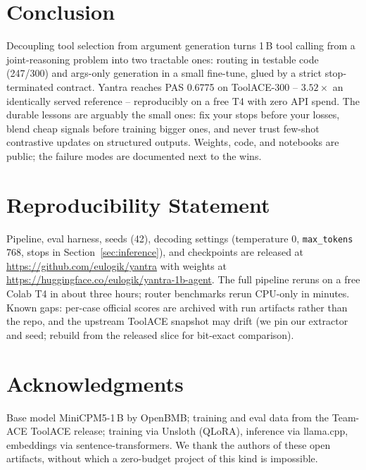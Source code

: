 \documentclass[11pt]{article}
\newcommand{\code}[1]{\texttt{#1}}
\begin{document}
\section{Conclusion}
\label{sec:conclusion}

Decoupling tool selection from argument generation turns 1\,B tool calling from a
joint-reasoning problem into two tractable ones: routing in testable code
(247/300) and args-only generation in a small fine-tune, glued by a strict
stop-terminated contract. Yantra reaches PAS 0.6775 on ToolACE-300 --
$3.52\times$ an identically served reference -- reproducibly on a free T4 with
zero API spend. The durable lessons are arguably the small ones: fix your stops
before your losses, blend cheap signals before training bigger ones, and never
trust few-shot contrastive updates on structured outputs. Weights, code, and
notebooks are public; the failure modes are documented next to the wins.

\section*{Reproducibility Statement}
Pipeline, eval harness, seeds (42), decoding settings (temperature 0,
\code{max\_tokens} 768, stops in Section~\ref{sec:inference}), and checkpoints
are released at \url{https://github.com/eulogik/yantra} with weights at
\url{https://huggingface.co/eulogik/yantra-1b-agent}. The full pipeline reruns on a free
Colab T4 in about three hours; router benchmarks rerun CPU-only in minutes.
Known gaps: per-case official scores are archived with run artifacts rather than
the repo, and the upstream ToolACE snapshot may drift (we pin our extractor and
seed; rebuild from the released slice for bit-exact comparison).

\section*{Acknowledgments}
Base model MiniCPM5-1\,B by OpenBMB; training and eval data from the Team-ACE
ToolACE release; training via Unsloth (QLoRA), inference via llama.cpp,
embeddings via sentence-transformers. We thank the authors of these open
artifacts, without which a zero-budget project of this kind is
impossible.
\end{document}
